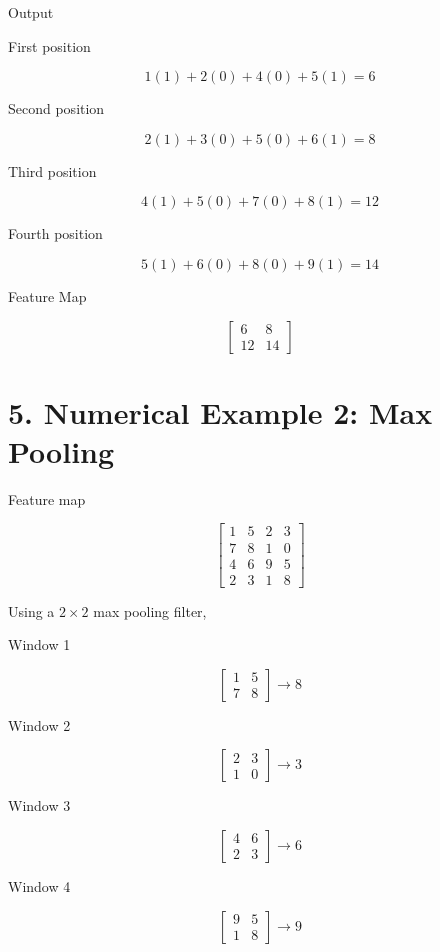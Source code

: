 \documentclass[11pt]{article}
\begin{document}
Output

First position

\[
1(1)+2(0)+4(0)+5(1)=6
\]

Second position

\[
2(1)+3(0)+5(0)+6(1)=8
\]

Third position

\[
4(1)+5(0)+7(0)+8(1)=12
\]

Fourth position

\[
5(1)+6(0)+8(0)+9(1)=14
\]

Feature Map

\[
\begin{bmatrix}
6&8\\
12&14
\end{bmatrix}
\]


\section*{5. Numerical Example 2: Max Pooling}

Feature map

\[
\begin{bmatrix}
1&5&2&3\\
7&8&1&0\\
4&6&9&5\\
2&3&1&8
\end{bmatrix}
\]

Using a $2\times2$ max pooling filter,

Window 1

\[
\begin{bmatrix}
1&5\\
7&8
\end{bmatrix}
\rightarrow 8
\]

Window 2

\[
\begin{bmatrix}
2&3\\
1&0
\end{bmatrix}
\rightarrow3
\]

Window 3

\[
\begin{bmatrix}
4&6\\
2&3
\end{bmatrix}
\rightarrow6
\]

Window 4

\[
\begin{bmatrix}
9&5\\
1&8
\end{bmatrix}
\rightarrow9
\]
\end{document}
